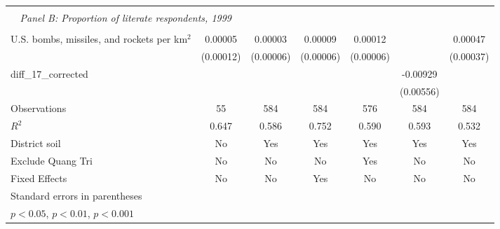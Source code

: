 \begin{table}[htbp]
\begin{tabular}{l*{6}{c}}
\hline \\ \multicolumn{2}{c}{\emph{Panel B: Proportion of literate respondents, 1999}} \\\\[-1ex]
U.S. bombs, missiles, and rockets per km$^2$&     0.00005         &     0.00003         &     0.00009         &     0.00012\sym{*}  &                     &     0.00047         \\
                    &   (0.00012)         &   (0.00006)         &   (0.00006)         &   (0.00006)         &                     &   (0.00037)         \\
[1em]
diff\_17\_corrected   &                     &                     &                     &                     &    -0.00929         &                     \\
                    &                     &                     &                     &                     &   (0.00556)         &                     \\
\hline
Observations        &          55         &         584         &         584         &         576         &         584         &         584         \\
\(R^{2}\)           &       0.647         &       0.586         &       0.752         &       0.590         &       0.593         &       0.532         \\
District soil       &          No         &         Yes         &         Yes         &         Yes         &         Yes         &         Yes         \\
Exclude Quang Tri   &          No         &          No         &          No         &         Yes         &          No         &          No         \\
Fixed Effects       &          No         &          No         &         Yes         &          No         &          No         &          No         \\
\hline\hline \multicolumn{5}{l}{\footnotesize Standard errors in parentheses}\\\multicolumn{3}{l}{\footnotesize \sym{*} \(p<0.05\), \sym{**} \(p<0.01\), \sym{***} \(p<0.001\)}\\ \end{tabular} \\ \end{table}
